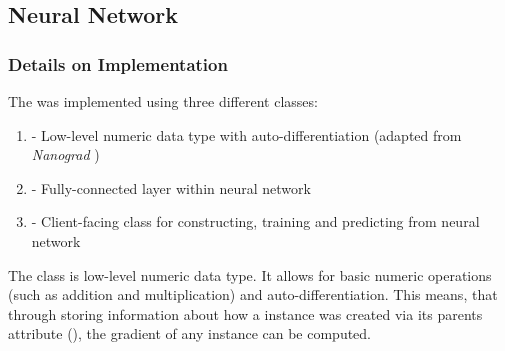 \subsection{Neural Network}
\subsubsection{Details on Implementation}

The  was implemented using three different classes:

\begin{enumerate}
    \item {} - Low-level numeric data type with auto-differentiation  (adapted from \textit{Nanograd} \cite{Autograd})
    \item {} - Fully-connected layer within neural network 
    \item {} - Client-facing class for constructing, training and predicting from neural network
\end{enumerate}
\vspace{10pt}

The  class is low-level numeric data type. It allows for basic numeric operations (such as addition and multiplication) and auto-differentiation. This means, that through storing information about how a  instance was created via its parents attribute (), the gradient of any  instance can be computed.

